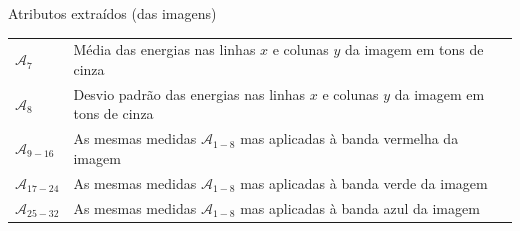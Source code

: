 \documentclass{beamer}
\begin{document}
\begin{frame}{Atributos extraídos (das imagens)}
\begin{table}
\begin{center}
{\begin{tabular}{l|l}
    $\mathcal{A}_7$ &
    Média das energias nas linhas $x$ e colunas $y$ da imagem em tons de cinza \\

    $\mathcal{A}_8$ &
    Desvio padrão das energias nas linhas $x$ e colunas $y$ da imagem em tons de
    cinza \\

    $\mathcal{A}_{9-16}$ &
    As mesmas medidas $\mathcal{A}_{1-8}$ mas aplicadas à banda vermelha da
    imagem \\

    $\mathcal{A}_{17-24}$ &
    As mesmas medidas $\mathcal{A}_{1-8}$ mas aplicadas à banda verde da
    imagem \\

    $\mathcal{A}_{25-32}$ &
    As mesmas medidas $\mathcal{A}_{1-8}$ mas aplicadas à banda azul da
    imagem \\

     \hline
    \end{tabular}}

  \end{center}
\end{table}

\end{frame}
\end{document}
